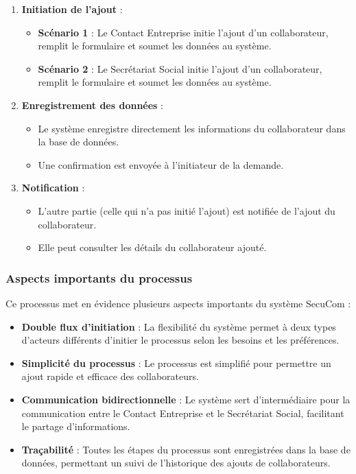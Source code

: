 \begin{enumerate}
  \item \textbf{Initiation de l'ajout} :
    \begin{itemize}[leftmargin=*,label=\textcolor{darkgray}{$\bullet$},itemsep=0.3em]
      \item \textbf{Scénario 1} : Le Contact Entreprise initie l'ajout d'un collaborateur, remplit le formulaire et soumet les données au système.
      \item \textbf{Scénario 2} : Le Secrétariat Social initie l'ajout d'un collaborateur, remplit le formulaire et soumet les données au système.
    \end{itemize}

  \item \textbf{Enregistrement des données} :
    \begin{itemize}[leftmargin=*,label=\textcolor{darkgray}{$\bullet$},itemsep=0.3em]
      \item Le système enregistre directement les informations du collaborateur dans la base de données.
      \item Une confirmation est envoyée à l'initiateur de la demande.
    \end{itemize}

  \item \textbf{Notification} :
    \begin{itemize}[leftmargin=*,label=\textcolor{darkgray}{$\bullet$},itemsep=0.3em]
      \item L'autre partie (celle qui n'a pas initié l'ajout) est notifiée de l'ajout du collaborateur.
      \item Elle peut consulter les détails du collaborateur ajouté.
    \end{itemize}
\end{enumerate}

\subsubsection{Aspects importants du processus}

Ce processus met en évidence plusieurs aspects importants du système SecuCom :

\begin{itemize}
  \item \textbf{Double flux d'initiation} : La flexibilité du système permet à deux types d'acteurs différents d'initier le processus selon les besoins et les préférences.
  \item \textbf{Simplicité du processus} : Le processus est simplifié pour permettre un ajout rapide et efficace des collaborateurs.
  \item \textbf{Communication bidirectionnelle} : Le système sert d'intermédiaire pour la communication entre le Contact Entreprise et le Secrétariat Social, facilitant le partage d'informations.
  \item \textbf{Traçabilité} : Toutes les étapes du processus sont enregistrées dans la base de données, permettant un suivi de l'historique des ajouts de collaborateurs.
\end{itemize}

